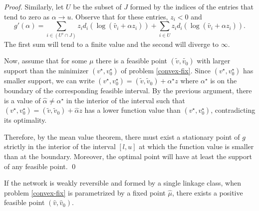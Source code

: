 \documentclass[smallextended]{svjour3}       %
\newcommand*{\0}{\mathbf{0}}
\newcommand*{\1}{\mathbf{1}}
\begin{document}
\begin{proof}
    Similarly, let $U$ be the subset of $J$ formed by the indices of the
    entries that tend to zero as $\alpha\rightarrow u$. Observe that for these
    entries, $z_i<0$ and
  \[
    g'(\alpha) = \sum_{i\in (U^c\cap J)} z_i d_i(\log{(\tilde{v_i}+\alpha z_i)})
               + \sum_{i\in U}   z_i d_i(\log{(\tilde{v_i}+\alpha z_i)}).
  \]
	The first sum will tend to a finite value and the second will diverge to
	$\infty$. 
	
	Now, assume that for some $\mu$ there is a feasible point
	$(\tilde{v},\tilde{v_0})$ with larger support than the minimizer
	$(v^\star,v^\star_0)$ of problem \eqref{convex-fix}.  Since
	$(v^\star,v_0^\star)$ has smaller support, we can write  $(v^\star,
	v_0^\star) = (\tilde{v},\tilde{v}_0) + \alpha^\star z$ where $\alpha^\star$
	is on the boundary of the corresponding feasible interval.  By the
	previous argument, there is a value of $\hat \alpha \neq \alpha^\star$ in the
	interior of the interval such that $(v^\star, v_0^\star) =
	(\tilde{v},\tilde{v}_0) + \hat \alpha z$ has a lower function value than
	$(v^\star,v^\star_0)$, contradicting its optimality.

	Therefore, by the mean value theorem, there must exist a stationary point of
	$g$ strictly in the interior of the interval $[l,u]$ at which the function
	value is smaller than at the boundary.  Moreover, the optimal point will have
	at least the support of any feasible point.  
   \qed
\end{proof}



\begin{lemma}
	If the network is weakly reversible and formed by a single linkage class, when problem
	\eqref{convex-fix} is parametrized by a fixed point $\hat\mu$,  there
	exists a positive feasible point $(\hat v,\hat v_0)$.
\label{positive-feasible}
\end{lemma}
\end{document}
